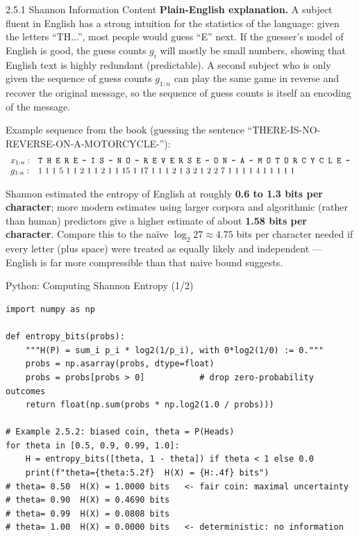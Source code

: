 \documentclass[aspectratio=169,10pt]{beamer}
\begin{document}
\begin{frame}[allowframebreaks]{2.5.1 Shannon Information Content}
\textbf{Plain-English explanation.} A subject fluent in English has a strong
intuition for the statistics of the language: given the letters ``TH...'',
most people would guess ``E'' next. If the guesser's model of English is
good, the guess counts $g_i$ will mostly be small numbers, showing that
English text is highly redundant (predictable). A second subject who is only
given the sequence of guess counts $g_{1:n}$ can play the same game in
reverse and recover the original message, so the sequence of guess counts is
itself an encoding of the message.

Example sequence from the book (guessing the sentence ``THERE-IS-NO-REVERSE-ON-A-MOTORCYCLE-''):
\[
\begin{array}{l l}
x_{1:n}: & \texttt{T H E R E - I S - N O - R E V E R S E - O N - A - M O T O R C Y C L E -} \\
g_{1:n}: & 1\ 1\ 1\ 5\ 1\ 1\ 2\ 1\ 1\ 2\ 1\ 1\ 15\ 1\ 17\ 1\ 1\ 1\ 2\ 1\ 3\ 2\ 1\ 2\ 2\ 7\ 1\ 1\ 1\ 1\ 4\ 1\ 1\ 1\ 1\ 1
\end{array}
\]

Shannon estimated the entropy of English at roughly \textbf{0.6 to 1.3 bits
per character}; more modern estimates using larger corpora and algorithmic
(rather than human) predictors give a higher estimate of about
\textbf{1.58 bits per character}. Compare this to the na\"ive $\log_2 27
\approx 4.75$ bits per character needed if every letter (plus space) were
treated as equally likely and independent --- English is far more
compressible than that naive bound suggests.
\end{frame}

\begin{frame}[fragile]{Python: Computing Shannon Entropy (1/2)}
\begin{lstlisting}[style=python]
import numpy as np

def entropy_bits(probs):
    """H(P) = sum_i p_i * log2(1/p_i), with 0*log2(1/0) := 0."""
    probs = np.asarray(probs, dtype=float)
    probs = probs[probs > 0]           # drop zero-probability outcomes
    return float(np.sum(probs * np.log2(1.0 / probs)))

# Example 2.5.2: biased coin, theta = P(Heads)
for theta in [0.5, 0.9, 0.99, 1.0]:
    H = entropy_bits([theta, 1 - theta]) if theta < 1 else 0.0
    print(f"theta={theta:5.2f}  H(X) = {H:.4f} bits")
# theta= 0.50  H(X) = 1.0000 bits   <- fair coin: maximal uncertainty
# theta= 0.90  H(X) = 0.4690 bits
# theta= 0.99  H(X) = 0.0808 bits
# theta= 1.00  H(X) = 0.0000 bits   <- deterministic: no information
\end{lstlisting}
\end{frame}
\end{document}
